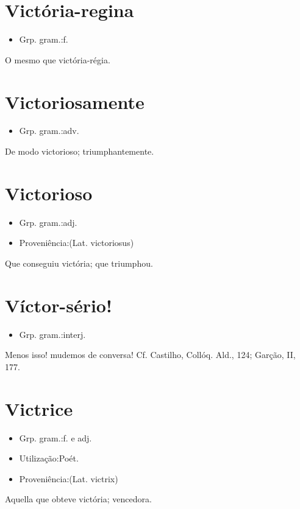 \documentclass{article}
\begin{document}
\section{Victória-regina}
\begin{itemize}
\item {Grp. gram.:f.}
\end{itemize}
O mesmo que \textunderscore victória-régia\textunderscore .
\section{Victoriosamente}
\begin{itemize}
\item {Grp. gram.:adv.}
\end{itemize}
De modo victorioso; triumphantemente.
\section{Victorioso}
\begin{itemize}
\item {Grp. gram.:adj.}
\end{itemize}
\begin{itemize}
\item {Proveniência:(Lat. \textunderscore victoriosus\textunderscore )}
\end{itemize}
Que conseguiu victória; que triumphou.
\section{Víctor-sério!}
\begin{itemize}
\item {Grp. gram.:interj.}
\end{itemize}
Menos isso! mudemos de conversa! Cf. Castilho, \textunderscore Collóq. Ald.\textunderscore , 124; Garção, II, 177.
\section{Victrice}
\begin{itemize}
\item {Grp. gram.:f.  e  adj.}
\end{itemize}
\begin{itemize}
\item {Utilização:Poét.}
\end{itemize}
\begin{itemize}
\item {Proveniência:(Lat. \textunderscore victrix\textunderscore )}
\end{itemize}
Aquella que obteve victória; vencedora.
\end{document}
